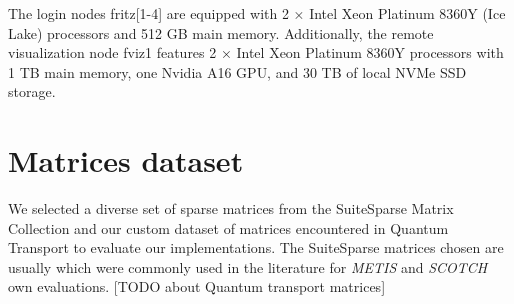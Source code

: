 The login nodes fritz[1-4] are equipped with 2 × Intel Xeon Platinum 8360Y (Ice Lake) processors and 512 GB main memory. Additionally, the remote visualization node fviz1 features 2 × Intel Xeon Platinum 8360Y processors with 1 TB main memory, one Nvidia A16 GPU, and 30 TB of local NVMe SSD storage.





\section{Matrices dataset}

We selected a diverse set of sparse matrices from the SuiteSparse Matrix Collection and our custom dataset of matrices encountered in Quantum Transport to evaluate our implementations. The SuiteSparse matrices chosen are usually which were commonly used in the literature for \textit{METIS} and \textit{SCOTCH} own evaluations. 
[TODO about Quantum transport matrices]


